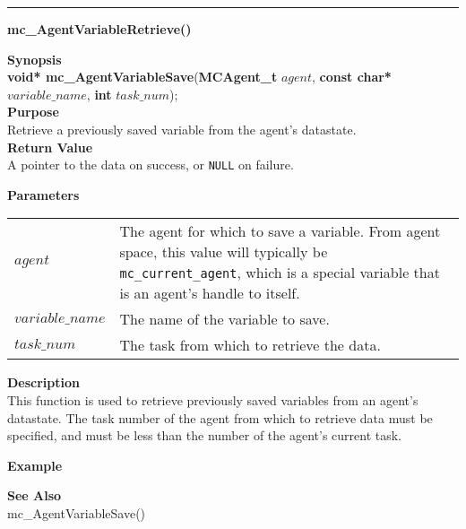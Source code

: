 \noindent
\vspace{5pt}
\rule{6.5in}{0.015in}
\noindent
{}
{\LARGE \bf mc\_AgentVariableRetrieve()}\\

\noindent
\label{apidoc:mc_AgentVariableRetrieve}
{\bf Synopsis}\\
{\bf void* mc\_AgentVariableSave}({\bf MCAgent\_t} $agent$, {\bf const char*} $variable\_name$, {\bf int} $task\_num$);\\

\noindent
{\bf Purpose}\\
Retrieve a previously saved variable from the agent's datastate. \\

\noindent
{\bf Return Value}\\
A pointer to the data on success, or \texttt{NULL} on failure.

\noindent
{\bf Parameters}
\vspace{-0.1in}
\begin{description}
\item
\begin{tabular}{p{25 mm}p{130 mm}}
$agent$ & The agent for which to save a variable. From agent space, this value 
will typically be \texttt{mc\_current\_agent}, which is a special variable that
is an agent's handle to itself. \\
$variable\_name$ & The name of the variable to save. \\
$task\_num$ & The task from which to retrieve the data.
\end{tabular}
\end{description}

\noindent
{\bf Description}\\
This function is used to retrieve previously saved variables from an agent's
datastate. The task number of the agent from which to retrieve data must be 
specified, and must be less than the number of the agent's current task.

\noindent
{\bf Example}\\
\noindent
{\footnotesize}

\noindent
{\bf See Also}\\
    mc\_AgentVariableSave()

